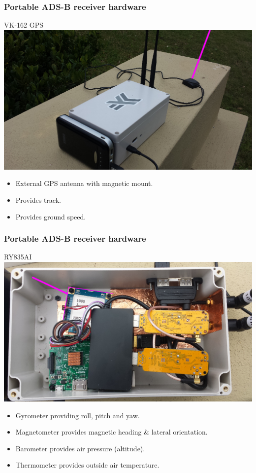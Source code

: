 \begin{frame}
\frametitle{Portable ADS-B receiver hardware}
\begin{block}{VK-162 GPS}
\includegraphics[height=0.5\textheight]{image/adsb-hardware-vk162.png}
\begin{itemize}
\item External GPS antenna with magnetic mount.
\item Provides track.
\item Provides ground speed.
\end{itemize}
\end{block}
\end{frame}

\begin{frame}
\frametitle{Portable ADS-B receiver hardware}
\begin{block}{RY835AI}
\includegraphics[height=0.5\textheight]{image/adsb-hardware-ry835ai.png}
\tiny
\begin{itemize}
\item Gyrometer providing roll, pitch and yaw.
\item Magnetometer provides magnetic heading \& lateral orientation.
\item Barometer provides air pressure (altitude).
\item Thermometer provides outside air temperature.
\end{itemize}
\end{block}
\end{frame}

